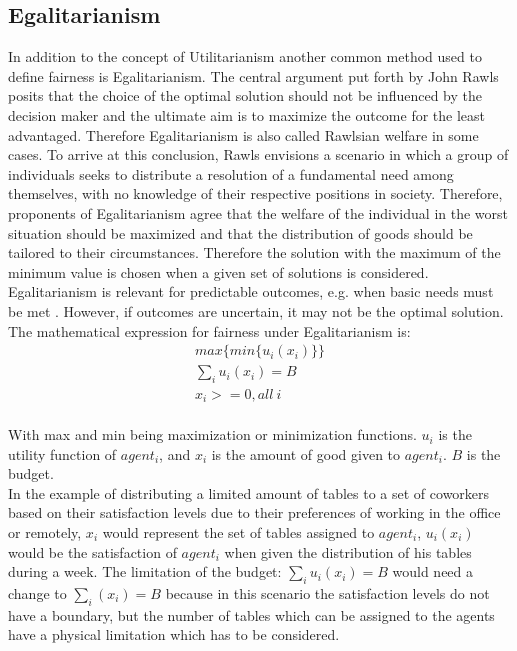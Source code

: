 \documentclass[german, a4paper, 11pt, oneside]{scrbook}
\begin{document}
\subsection{Egalitarianism}
In addition to the concept of Utilitarianism another common method used to define fairness is Egalitarianism. The central argument put forth by John Rawls posits that the choice of the optimal solution should not be influenced by the decision maker and the ultimate aim is to maximize the outcome for the least advantaged. \cite{XinyingChen.2023,Hooker,Matt.2006} Therefore Egalitarianism is also called Rawlsian welfare in some cases. To arrive at this conclusion, Rawls envisions a scenario in which a group of individuals seeks to distribute a resolution of a fundamental need among themselves, with no knowledge of their respective positions in society. Therefore, proponents of Egalitarianism agree that the welfare of the individual in the worst situation should be maximized and that the distribution of goods should be tailored to their circumstances. Therefore the solution with the maximum of the minimum value is chosen when a given set of solutions is considered.
 \cite{XinyingChen.2023,Brandt,Hooker} \\ Egalitarianism is relevant for predictable outcomes, e.g. when basic needs must be met \cite{Hooker}. However, if outcomes are uncertain, it may not be the optimal solution. The mathematical expression for fairness under Egalitarianism is:
\begin{align}
max\{ min\{u_i(x_i)\}\}\\
\sum_{i}u_i(x_i) = B\\
x_i>=0, \mathit{all\   i}
\end{align}  \cite{Hooker}
\\With max and min being maximization or minimization functions. $u_i$ is the utility function of $agent_i$, and $x_i$ is the amount of good given to $agent_i$. $B$ is the budget.
\\In the example of distributing a limited amount of tables to a set of coworkers based on their satisfaction levels due to their preferences of working in the office or remotely, $x_i$ would represent the set of tables assigned to $agent_i$, $u_i(x_i)$ would be the satisfaction of $agent_i$ when given the distribution of his tables during a week. The limitation of the budget: $\sum_{i}u_i(x_i) = B$ would need a change to $\sum_{i}(x_i) = B$ because in this scenario the satisfaction levels do not have a boundary, but the number of tables which can be assigned to the agents have a physical limitation which has to be considered. 
\end{document}
